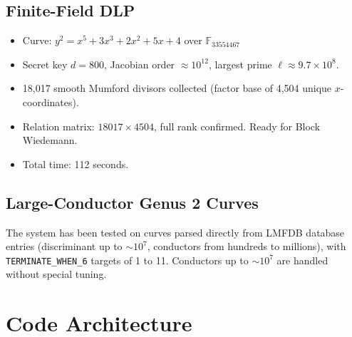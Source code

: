 \documentclass[11pt, a4paper]{article}
\begin{document}
\subsection{Finite-Field DLP}

\begin{itemize}[label={\textbullet}]
    \item Curve: $y^2 = x^5 + 3x^3 + 2x^2 + 5x + 4$ over $\mathbb{F}_{33554467}$
    \item Secret key $d = 800$, Jacobian order $\approx 10^{12}$, largest prime $\ell \approx 9.7 \times 10^8$.
    \item 18,017 smooth Mumford divisors collected (factor base of 4,504 unique $x$-coordinates).
    \item Relation matrix: $18017 \times 4504$, full rank confirmed. Ready for Block Wiedemann.
    \item Total time: 112 seconds.
\end{itemize}

\subsection{Large-Conductor Genus 2 Curves}

The system has been tested on curves parsed directly from LMFDB database entries (discriminant up to $\sim 10^7$, conductors from hundreds to millions), with \texttt{TERMINATE\_WHEN\_6} targets of 1 to 11. Conductors up to $\sim 10^7$ are handled without special tuning.

\section{Code Architecture}
\end{document}
